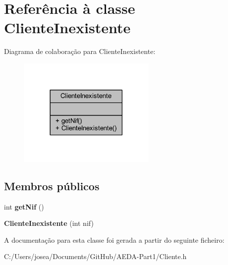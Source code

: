 \hypertarget{class_cliente_inexistente}{}\section{Referência à classe Cliente\+Inexistente}
\label{class_cliente_inexistente}


Diagrama de colaboração para Cliente\+Inexistente\+:
\nopagebreak
\begin{figure}[H]
\begin{center}
\leavevmode
\includegraphics[width=189pt]{class_cliente_inexistente__coll__graph}
\end{center}
\end{figure}
\subsection*{Membros públicos}
\begin{DoxyCompactItemize}
\item 
\hypertarget{class_cliente_inexistente_a020a5414aa9e2714ddeb952a6fd450f4}{}int {\bfseries get\+Nif} ()\label{class_cliente_inexistente_a020a5414aa9e2714ddeb952a6fd450f4}

\item 
\hypertarget{class_cliente_inexistente_a631838af9356603343f06a3492dc20ee}{}{\bfseries Cliente\+Inexistente} (int nif)\label{class_cliente_inexistente_a631838af9356603343f06a3492dc20ee}

\end{DoxyCompactItemize}


A documentação para esta classe foi gerada a partir do seguinte ficheiro\+:\begin{DoxyCompactItemize}
\item 
C\+:/\+Users/josea/\+Documents/\+Git\+Hub/\+A\+E\+D\+A-\/\+Part1/Cliente.\+h\end{DoxyCompactItemize}
